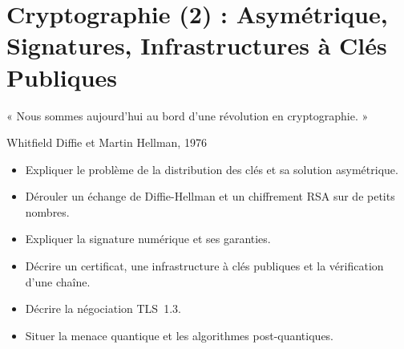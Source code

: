 
\chapter{Cryptographie (2) : Asymétrique, Signatures, Infrastructures à Clés Publiques}
\label{chap:crypto-asym}

\epigraph{%
    « Nous sommes aujourd'hui au bord d'une révolution en cryptographie. »%
}{Whitfield Diffie et Martin Hellman, 1976}


\begin{boxobjectifs}
\begin{itemize}
    \item Expliquer le problème de la distribution des clés et sa solution
          asymétrique.
    \item Dérouler un échange de Diffie-Hellman et un chiffrement RSA sur de
          petits nombres.
    \item Expliquer la signature numérique et ses garanties.
    \item Décrire un certificat, une infrastructure à clés publiques et la
          vérification d'une chaîne.
    \item Décrire la négociation TLS~1.3.
    \item Situer la menace quantique et les algorithmes post-quantiques.
\end{itemize}
\end{boxobjectifs}

\bigskip

